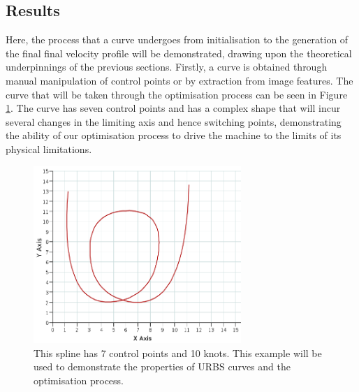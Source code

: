 \subsection{Results}
Here, the process that a curve undergoes from initialisation to the generation of the final final velocity profile will be demonstrated, drawing upon the theoretical underpinnings of the previous sections.
Firstly, a curve is obtained through manual manipulation of control points or by extraction from image features. The curve that will be taken through the optimisation process can be seen in Figure \ref{fig:example}. The curve has seven control points and has a complex shape that will incur several changes in the limiting axis and hence switching points, demonstrating the ability of our optimisation process to drive the machine to the limits of its physical limitations.

\begin{figure}[htbp]  
\centering
\includegraphics[width=0.7\textwidth]{figures/optimisation/exampleSpline.png}
\caption[Optimisation example curve]{ This spline has 7 control points and 10 knots. This example will be used to demonstrate the properties of URBS curves and the optimisation process.
\label{fig:example}}
\end{figure}

